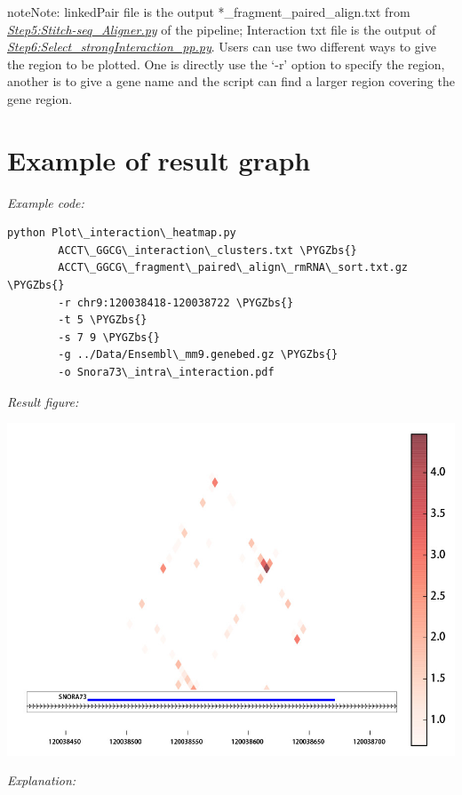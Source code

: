 \documentclass[letterpaper,10pt,english]{sphinxmanual}
\def\PYGZbs{\char`\\}
\begin{document}
\begin{notice}{note}{Note:}
linkedPair file is the output *\_fragment\_paired\_align.txt from {\hyperref[Analysis_pipeline:step5]{\emph{Step5:Stitch-seq\_Aligner.py}}} of the pipeline; Interaction txt file is the output of {\hyperref[Analysis_pipeline:step6]{\emph{Step6:Select\_strongInteraction\_pp.py}}}. Users can use two different ways to give the region to be plotted. One is directly use the `-r' option to specify the region, another is to give a gene name and the script can find a larger region covering the gene region.
\end{notice}


\section{Example of result graph}
\label{Visualization:id2}
\emph{Example code:}

\begin{Verbatim}[commandchars=\\\{\}]
python Plot\_interaction\_heatmap.py
        ACCT\_GGCG\_interaction\_clusters.txt \PYGZbs{}
        ACCT\_GGCG\_fragment\_paired\_align\_rmRNA\_sort.txt.gz \PYGZbs{}
        -r chr9:120038418-120038722 \PYGZbs{}
        -t 5 \PYGZbs{}
        -s 7 9 \PYGZbs{}
        -g ../Data/Ensembl\_mm9.genebed.gz \PYGZbs{}
        -o Snora73\_intra\_interaction.pdf
\end{Verbatim}

\emph{Result figure:}

\includegraphics{Snora73_intra_interaction.jpg}

\emph{Explanation:}
\end{document}
